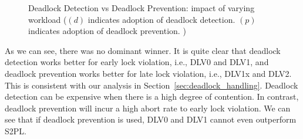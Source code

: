 \documentclass[conference]{IEEEtran}
\begin{document}
\begin{figure}[tbp]
  \centering



            

\caption{Deadlock Detection vs Deadlock Prevention: impact of varying workload
($(d)$ indicates adoption of deadlock detection. $(p)$ indicates adoption of deadlock prevention. ) }
\label{fig:ycsb_deadlock}
\end{figure}

      
As we can see, there was no dominant winner. It is quite clear that deadlock detection works better for early lock violation, i.e., DLV0 and DLV1, 
and deadlock prevention works better for late lock violation, i.e., DLV1x and DLV2. This is consistent with our analysis in Section~\ref{sec:deadlock_handling}.
Deadlock detection can be expensive when there is a high degree of contention. In contrast, deadlock prevention will incur a high abort rate to early lock violation.
We can see that if deadlock prevention is used, DLV0 and DLV1 cannot even outperform S2PL. 
\end{document}
